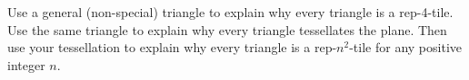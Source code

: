 %
%
%

\begin{prob}
Use a general (non-special) triangle to explain why every triangle is a rep-4-tile.  
Use the same triangle to explain why every triangle tessellates the plane.  Then use your tessellation to explain why every triangle is a rep-$n^2$-tile for any positive integer $n$. 
\end{prob}


